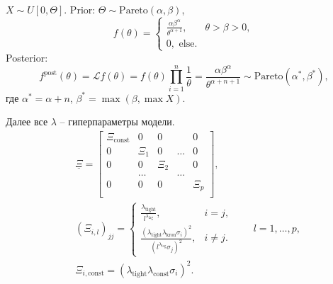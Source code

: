         \begin{example}
            $X\sim U[0, \Theta]$. Prior: $\Theta \sim \mathrm{Pareto}(\alpha, \beta)$, \begin{equation*}
                f(\theta) = \begin{cases}
                    \frac{\alpha \beta^\alpha}{\theta^{\alpha+1}}, & \theta > \beta > 0, \\
                    0, \text{ else}.
                \end{cases}
            \end{equation*}
            Posterior: \begin{equation*}
                f^{\text{post}}(\theta) =\mathcal{L} f(\theta) = f(\theta) \prod_{i=1}^{n}\frac{1}{\theta} = \frac{\alpha \beta^\alpha}{\theta^{\alpha+n+1}} \sim \mathrm{Pareto}(\alpha^*, \beta^*),
            \end{equation*}
            где $\alpha^* = \alpha + n$, $\beta^* = \max(\beta,\max X)$.
        \end{example}
        Далее все $\lambda$ -- гиперпараметры модели.
        \begin{align*}
            &\underline\Xi = \left[\begin{matrix}
                 \Xi_\text{const} & 0 & 0 &  & 0 \\
                 0 & \Xi_1 & 0 & \dots & 0 \\
                 0 & 0 & \Xi_2 &  & 0 \\
                  & \dots &  & \dots &  \\
                 0 & 0 & 0 &  & \Xi_{p} \\
            \end{matrix}\right], \\
            &(\Xi_{i, l})_{jj} = \begin{cases}
                \frac{\lambda_{\text{tight}}}{l^{\lambda_{\text{lag}}}}, & i=j, \\
                \frac{(\lambda_{\text{tight}} \lambda_{\text{kron}} \sigma_i)^2}{(l^{\lambda_{\text{lag}}} \sigma_j)^2}, & i\neq j.
            \end{cases}\qquad {l = 1, \dots, p}, \\
            & \Xi_{i,\text{const}} = (\lambda_{\text{tight}} \lambda_{\text{const}} \sigma_i)^2.
        \end{align*}

